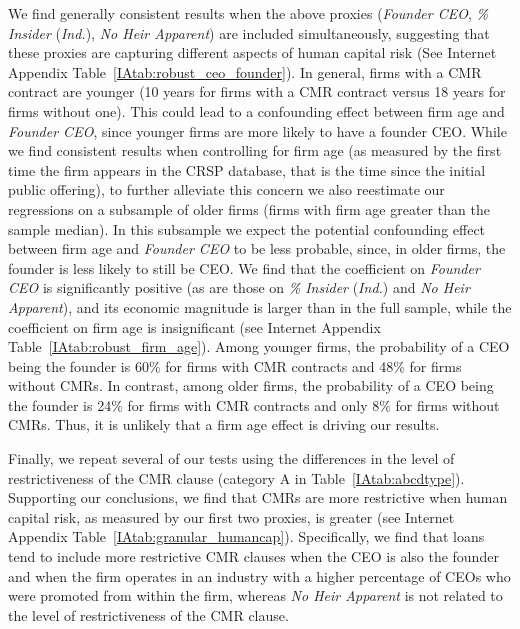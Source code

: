 \documentclass[a4paper,12pt]{article}
\begin{document}
We find generally consistent results when the above proxies (\textit{Founder CEO}, \textit{\% Insider} (\textit{Ind.}), \textit{No Heir Apparent}) are included simultaneously, suggesting that these proxies are capturing different aspects of human capital risk (See Internet Appendix Table~\ref{IAtab:robust_ceo_founder}).
In general, firms with a CMR contract are younger (10 years for firms with a CMR contract versus 18 years for firms without one).
This could lead to a confounding effect between firm age and \textit{Founder CEO}, since younger firms are more likely to have a founder CEO.
While we find consistent results when controlling for firm age (as measured by the first time the firm appears in the CRSP database, that is the time since the initial public offering), to further alleviate this concern we also reestimate our regressions on a subsample of older firms (firms with firm age greater than the sample median).
In this subsample we expect the potential confounding effect between firm age and \textit{Founder CEO} to be less probable, since, in older firms, the founder is less likely to still be CEO.
We find that the coefficient on \textit{Founder CEO} is significantly positive (as are those on \textit{\% Insider} (\textit{Ind.}) and \textit{No Heir Apparent}), and its economic magnitude is larger than in the full sample, while the coefficient on firm age is insignificant (see Internet Appendix Table~\ref{IAtab:robust_firm_age}).
Among younger firms, the probability of a CEO being the founder is 60\% for firms with CMR contracts and 48\% for firms without CMRs.
In contrast, among older firms, the probability of a CEO being the founder is 24\% for firms with CMR contracts and only 8\% for firms without CMRs.
Thus, it is unlikely that a firm age effect is driving our results.



Finally, we repeat several of our tests using the differences in the level of restrictiveness of the CMR clause (category A in Table~\ref{IAtab:abcdtype}).
Supporting our conclusions, we find that CMRs are more restrictive when human capital risk, as measured by our first two proxies, is greater (see Internet Appendix Table~\ref{IAtab:granular_humancap}).
Specifically, we find that loans tend to include more restrictive CMR clauses when the CEO is also the founder and when the firm operates in an industry with a higher percentage of CEOs who were promoted from within the firm, whereas \textit{No Heir Apparent} is not related to the level of restrictiveness of the CMR clause.
\end{document}
